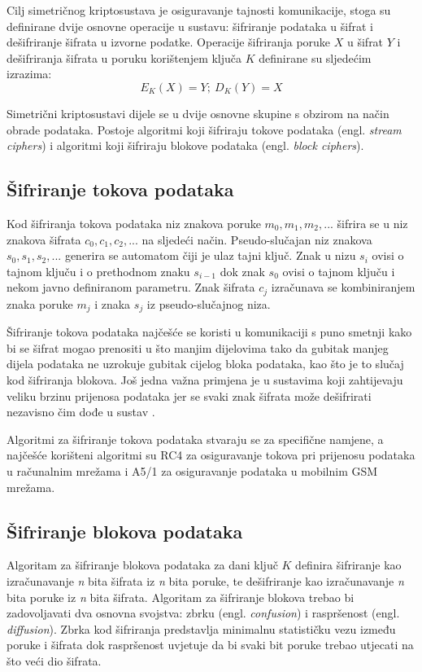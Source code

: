 Cilj simetričnog kriptosustava je osiguravanje tajnosti komunikacije,
stoga su definirane dvije osnovne operacije u sustavu: šifriranje podataka u
šifrat i dešifriranje šifrata u izvorne podatke. Operacije šifriranja poruke $X$
u šifrat $Y$ i dešifriranja šifrata u poruku korištenjem ključa $K$ definirane su
sljedećim izrazima:
$$E_K(X)=Y;\ D_K(Y)=X$$

Simetrični kriptosustavi dijele se u dvije osnovne skupine s obzirom na način
obrade podataka. Postoje algoritmi koji šifriraju tokove podataka  (engl.
\emph{stream ciphers}) i algoritmi koji šifriraju blokove podataka (engl.
\emph{block ciphers}).

\subsection{Šifriranje tokova podataka}
Kod šifriranja tokova podataka niz znakova poruke $m_0,m_1,m_2,...$ šifrira se u
niz
znakova šifrata $c_0,c_1,c_2,...$ na sljedeći način. Pseudo-slučajan niz
znakova $s_0,s_1,s_2,...$ generira se automatom čiji je ulaz tajni ključ.
Znak u nizu $s_i$ ovisi o tajnom ključu i o prethodnom znaku
$s_{i-1}$ dok znak $s_0$ ovisi o tajnom ključu i nekom javno definiranom
parametru. Znak šifrata $c_j$ izračunava se
kombiniranjem znaka poruke $m_j$ i
znaka $s_j$ iz pseudo-slučajnog niza.

Šifriranje tokova podataka najčešće se koristi u komunikaciji s puno smetnji
kako bi se šifrat mogao prenositi u što manjim dijelovima tako da gubitak manjeg
dijela podataka ne uzrokuje gubitak cijelog bloka podataka, kao što je to slučaj
kod šifriranja blokova. Još jedna važna primjena je u sustavima koji zahtijevaju
veliku brzinu prijenosa podataka jer se svaki znak šifrata može dešifrirati
nezavisno čim dođe u sustav \cite[str. 1265]{van2011encyclopedia}.

Algoritmi za šifriranje tokova podataka stvaraju se za specifične namjene,
a najčešće korišteni algoritmi su RC4 za osiguravanje tokova pri prijenosu
podataka u računalnim mrežama i A5/1 za osiguravanje
podataka u mobilnim GSM mrežama.

\subsection{Šifriranje blokova podataka}

Algoritam za šifriranje blokova podataka za dani ključ $K$ definira
šifriranje kao izračunavanje \emph{n} bita šifrata iz \emph{n} bita poruke, te
dešifriranje
kao izračunavanje \emph{n} bita poruke iz \emph{n} bita šifrata. Algoritam za
šifriranje
blokova trebao bi zadovoljavati dva osnovna svojstva: zbrku (engl.
\emph{confusion}) i raspršenost (engl. \emph{diffusion}). Zbrka kod šifriranja
predstavlja minimalnu statističku vezu između poruke i šifrata dok raspršenost
uvjetuje da bi svaki bit poruke trebao utjecati na što veći dio šifrata.
\cite[str. 152]{van2011encyclopedia}

